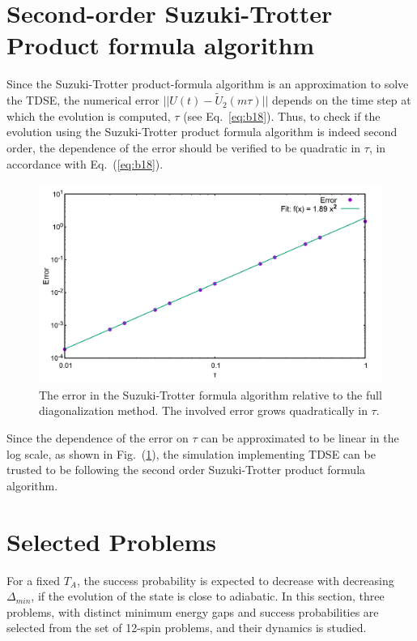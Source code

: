 \documentclass[../main.tex]{subfiles}
\begin{document}
\section{Second-order Suzuki-Trotter Product formula algorithm}
Since the Suzuki-Trotter product-formula algorithm is an approximation to solve the TDSE, the numerical error $\lvert \lvert U(t)-\tilde{U}_2(m \tau) \rvert \rvert $ depends on the time step at which the evolution is computed, $\tau$ (see Eq.~\ref{eq:b18}). 
Thus, to check if the evolution using the Suzuki-Trotter product formula algorithm is indeed second order, the dependence of the error should be verified to be quadratic in $\tau$, in accordance with Eq.~(\ref{eq:b18}). 
\begin{figure}[H]
\centering 
\includegraphics[scale=0.2]{Error.png}
\caption{The error in the Suzuki-Trotter formula algorithm relative to the full diagonalization method. The involved error grows quadratically in $\tau$.}
\label{fig:o1}
\end{figure}
Since the dependence of the error on $\tau$ can be approximated to be linear in the log scale, as shown in Fig.~(\ref{fig:o1}), the simulation implementing TDSE can be trusted to be following the second order Suzuki-Trotter product formula algorithm.

\section{Selected Problems}
For a fixed $T_A$, the success probability is expected to decrease with decreasing $\Delta_{min}$, if the evolution of the state is close to adiabatic. In this section, three problems, with distinct minimum energy gaps and success probabilities are selected from the set of 12-spin problems, and their dynamics is studied.\\
\end{document}
